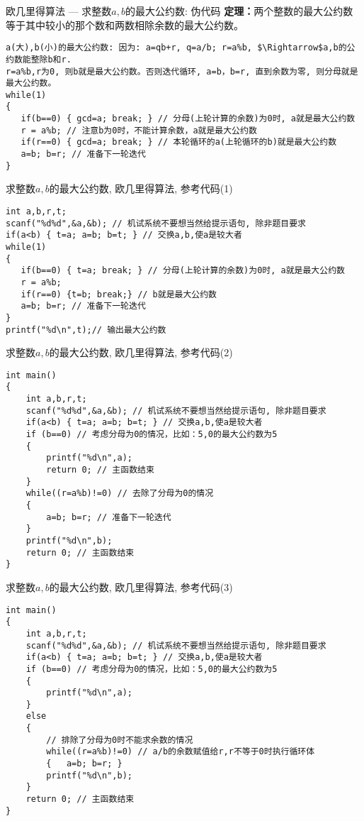 \begin{frame}[fragile]{欧几里得算法 --- 求整数$a,b$的最大公约数: 伪代码}
\textbf{定理：}两个整数的最大公约数等于其中较小的那个数和两数相除余数的最大公约数。

\medskip
\begin{lstlisting}
a(大),b(小)的最大公约数: 因为: a=qb+r, q=a/b; r=a%b, $\Rightarrow$a,b的公约数能整除b和r.
r=a%b,r为0, 则b就是最大公约数。否则迭代循环, a=b，b=r, 直到余数为零, 则分母就是最大公约数。 
while(1)
{
   if(b==0) { gcd=a; break; } // 分母(上轮计算的余数)为0时, a就是最大公约数
   r = a%b; // 注意b为0时，不能计算余数，a就是最大公约数
   if(r==0) { gcd=a; break; } // 本轮循环的a(上轮循环的b)就是最大公约数
   a=b; b=r; // 准备下一轮迭代    
}
\end{lstlisting}
\end{frame}

\begin{frame}{求整数$a,b$的最大公约数, 欧几里得算法, 参考代码(1)}
\begin{lstlisting}
int a,b,r,t;
scanf("%d%d",&a,&b); // 机试系统不要想当然给提示语句, 除非题目要求
if(a<b) { t=a; a=b; b=t; } // 交换a,b,使a是较大者
while(1)
{
   if(b==0) { t=a; break; } // 分母(上轮计算的余数)为0时, a就是最大公约数
   r = a%b; 
   if(r==0) {t=b; break;} // b就是最大公约数
   a=b; b=r; // 准备下一轮迭代   
}
printf("%d\n",t);// 输出最大公约数
\end{lstlisting}
\end{frame}

\begin{frame}{求整数$a,b$的最大公约数, 欧几里得算法, 参考代码(2)}
\begin{lstlisting}
int main()
{
	int a,b,r,t;
	scanf("%d%d",&a,&b); // 机试系统不要想当然给提示语句, 除非题目要求
	if(a<b) { t=a; a=b; b=t; } // 交换a,b,使a是较大者
	if (b==0) // 考虑分母为0的情况，比如：5,0的最大公约数为5 
	{
		printf("%d\n",a);
		return 0; // 主函数结束
	}
	while((r=a%b)!=0) // 去除了分母为0的情况
	{
		a=b; b=r; // 准备下一轮迭代   
	}
	printf("%d\n",b);
	return 0; // 主函数结束
}	
\end{lstlisting}
\end{frame}

\begin{frame}{求整数$a,b$的最大公约数, 欧几里得算法, 参考代码(3)}
\begin{lstlisting}
int main()
{
	int a,b,r,t;
	scanf("%d%d",&a,&b); // 机试系统不要想当然给提示语句, 除非题目要求
	if(a<b) { t=a; a=b; b=t; } // 交换a,b,使a是较大者
	if (b==0) // 考虑分母为0的情况，比如：5,0的最大公约数为5 
	{
		printf("%d\n",a);
	}
	else
	{
		// 排除了分母为0时不能求余数的情况 
		while((r=a%b)!=0) // a/b的余数赋值给r,r不等于0时执行循环体
		{	a=b; b=r; }
		printf("%d\n",b);
	}
	return 0; // 主函数结束
}	
\end{lstlisting}
\end{frame}


